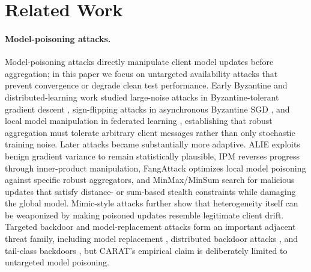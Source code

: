 \section{Related Work}
\label{sec:related-work}

\paragraph{Model-poisoning attacks.}
Model-poisoning attacks directly manipulate client model updates before aggregation; in this paper we focus on untargeted availability attacks that prevent convergence or degrade clean test performance. Early Byzantine and distributed-learning work studied large-noise attacks in Byzantine-tolerant gradient descent \citep{blanchard2017krum}, sign-flipping attacks in asynchronous Byzantine SGD \citep{damaskinos2018asynchronous}, and local model manipulation in federated learning \citep{bhagoji2019adversarial}, establishing that robust aggregation must tolerate arbitrary client messages rather than only stochastic training noise. Later attacks became substantially more adaptive. ALIE \citep{baruch2019alie} exploits benign gradient variance to remain statistically plausible, IPM \citep{xie2020ipm} reverses progress through inner-product manipulation, FangAttack \citep{fang2020local} optimizes local model poisoning against specific robust aggregators, and MinMax/MinSum \citep{shejwalkar2021manipulating} search for malicious updates that satisfy distance- or sum-based stealth constraints while damaging the global model. Mimic-style attacks \citep{karimireddy2022bucketing} further show that heterogeneity itself can be weaponized by making poisoned updates resemble legitimate client drift. Targeted backdoor and model-replacement attacks form an important adjacent threat family, including model replacement \citep{bagdasaryan2020backdoor}, distributed backdoor attacks \citep{xie2020dba}, and tail-class backdoors \citep{wang2020tails}, but CARAT's empirical claim is deliberately limited to untargeted model poisoning.

